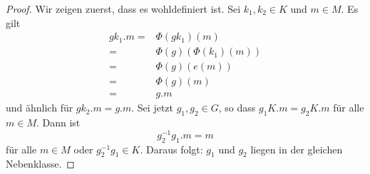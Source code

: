 \begin{proof}
	Wir zeigen zuerst, dass es wohldefiniert ist. Sei $k_1,k_2\in K$ und $m\in M$. Es gilt
	\begin{align*}
		gk_1.m=&\Phi(gk_1)(m)\\
		=&\Phi(g)(\Phi(k_1)(m))\\
		=&\Phi(g)(e(m))\\
		=&\Phi(g)(m)\\
		=&g.m
	\end{align*}
	und ähnlich für $gk_2.m=g.m$. Sei jetzt $g_1,g_2\in G$, so dass $g_1K.m=g_2K.m$ f\"{u}r alle $m\in M$. Dann ist
	\[
		g_2^{-1}g_1.m=m
	\]
	f\"{u}r alle $m\in M$ oder $g_2^{-1}g_1\in K$. Daraus folgt: $g_1$ und $g_2$ liegen in der gleichen Nebenklasse.
\end{proof}
